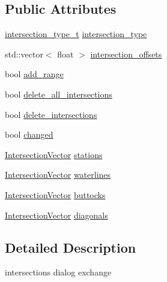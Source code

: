 \subsection*{Public Attributes}
\begin{DoxyCompactItemize}
\item 
\hyperlink{namespaceShipCAD_aa56834b730aafdf2786ddc9a60a046fd}{intersection\+\_\+type\+\_\+t} \hyperlink{structShipCAD_1_1IntersectionsDialogData_a45fdbb695bb58187c24037aba1eabca6}{intersection\+\_\+type}
\item 
std\+::vector$<$ float $>$ \hyperlink{structShipCAD_1_1IntersectionsDialogData_ac2a5677d64845ff41b99f05f590170f8}{intersection\+\_\+offsets}
\item 
bool \hyperlink{structShipCAD_1_1IntersectionsDialogData_a07f300ae3f6ec124a932ac88d7380194}{add\+\_\+range}
\item 
bool \hyperlink{structShipCAD_1_1IntersectionsDialogData_ae423b73a2c8644594ac4c7f56125af9f}{delete\+\_\+all\+\_\+intersections}
\item 
bool \hyperlink{structShipCAD_1_1IntersectionsDialogData_a0b612a856d1875fb0062907fb1cc77a7}{delete\+\_\+intersections}
\item 
bool \hyperlink{structShipCAD_1_1IntersectionsDialogData_a3f9b8b74cdacaed5cfdf2026dfaf2d75}{changed}
\item 
\hyperlink{namespaceShipCAD_a9910f0963197f9df6125398efd4fa139}{Intersection\+Vector} \hyperlink{structShipCAD_1_1IntersectionsDialogData_a15b25bd4167a7eb4bc24240f98ec83ad}{stations}
\item 
\hyperlink{namespaceShipCAD_a9910f0963197f9df6125398efd4fa139}{Intersection\+Vector} \hyperlink{structShipCAD_1_1IntersectionsDialogData_a239c93bd2e10930a0b73fa4a491b3332}{waterlines}
\item 
\hyperlink{namespaceShipCAD_a9910f0963197f9df6125398efd4fa139}{Intersection\+Vector} \hyperlink{structShipCAD_1_1IntersectionsDialogData_a42e8714909a6cb3f20d4508e3ed3d7cd}{buttocks}
\item 
\hyperlink{namespaceShipCAD_a9910f0963197f9df6125398efd4fa139}{Intersection\+Vector} \hyperlink{structShipCAD_1_1IntersectionsDialogData_aa646939995a2b52262724964a6e1fd47}{diagonals}
\end{DoxyCompactItemize}


\subsection{Detailed Description}
intersections dialog exchange 

